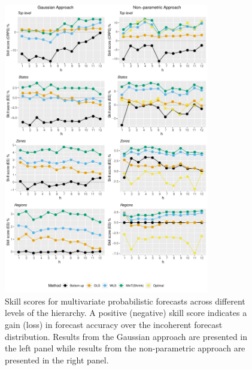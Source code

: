 \documentclass[12pt]{article}
\theoremstyle{definition}
\begin{document}
\begin{figure}
	\centering
	\small
	\includegraphics[width= 0.8\textwidth, height= 0.85\textheight]{Empirical-results/Results-ARIMA/Levels_Summary.pdf}
	\caption{Skill scores for multivariate probabilistic forecasts across different levels of the hierarchy. A positive (negative) skill score indicates a gain (loss) in forecast accuracy over the incoherent forecast distribution. Results from the Gaussian approach are presented in the left panel while results from the non-parametric approach are presented in the right panel.}\label{fig:EmpResults_Levels}
\end{figure}

\end{document}
